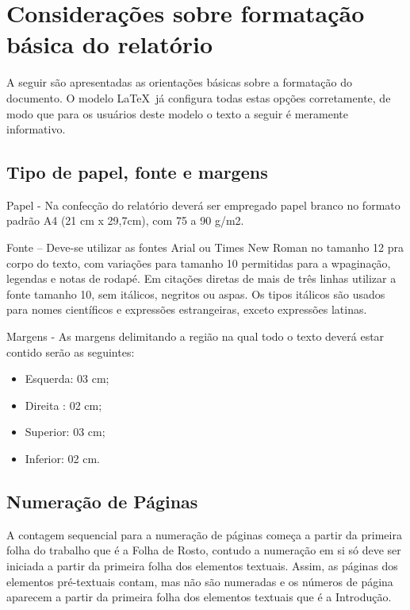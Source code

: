 \section{Considerações sobre formatação básica do relatório}

A seguir são apresentadas as orientações básicas sobre a formatação do
documento. O modelo \LaTeX\ já configura todas estas opções corretamente,
de modo que para os usuários deste modelo o texto a seguir é meramente
informativo.

\subsection{Tipo de papel, fonte e margens}

Papel - Na confecção do relatório deverá ser empregado papel branco no 
formato padrão A4 (21 cm x 29,7cm), com 75 a 90 g/m2.

Fonte – Deve-se utilizar as fontes Arial ou Times New Roman no tamanho 12 
pra corpo do texto, com variações para tamanho 10 permitidas para a 
wpaginação, legendas e notas de rodapé. Em citações diretas de mais de três 
linhas utilizar a fonte tamanho 10, sem itálicos, negritos ou aspas. Os 
tipos itálicos são usados para nomes científicos e expressões estrangeiras, 
exceto expressões latinas.

Margens - As margens delimitando a região na qual todo o texto deverá estar 
contido serão as seguintes: 

\begin{itemize}
    \item Esquerda: 03 cm;
    \item Direita	: 02 cm;
    \item Superior: 03 cm;
    \item Inferior: 02 cm. 
\end{itemize}

\subsection{Numeração de Páginas}

A contagem sequencial para a numeração de páginas começa a partir da 
primeira folha do trabalho que é a Folha de Rosto, contudo a numeração em 
si só deve ser iniciada a partir da primeira folha dos elementos textuais. 
Assim, as páginas dos elementos pré-textuais contam, mas não são numeradas 
e os números de página aparecem a partir da primeira folha dos elementos 
textuais que é a Introdução. 

